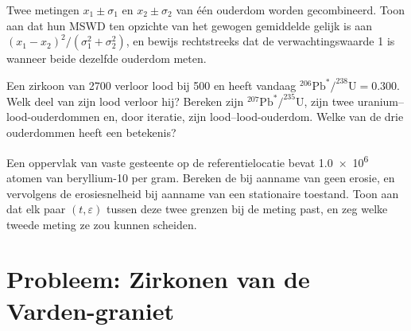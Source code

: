 \begin{exercise}[$\star\star\star$]\label{exo:b3:advanced-geochronology:10}
Twee metingen $x_1 \pm \sigma_1$ en $x_2 \pm \sigma_2$ van één ouderdom worden
gecombineerd. Toon aan dat hun MSWD ten opzichte van het gewogen gemiddelde gelijk is aan
$(x_1 - x_2)^2/(\sigma_1^2 + \sigma_2^2)$, en bewijs rechtstreeks dat de
verwachtingswaarde 1 is wanneer beide dezelfde ouderdom meten.
\end{exercise}

\begin{exercise}[$\star\star\star$]\label{exo:b3:advanced-geochronology:11}
Een zirkoon van \qty{2700}{\Ma} verloor lood bij \qty{500}{\Ma} en heeft vandaag
$^{206}\mathrm{Pb}^*/^{238}\mathrm{U} = 0.300$. Welk deel van zijn lood verloor hij?
Bereken zijn $^{207}\mathrm{Pb}^*/^{235}\mathrm{U}$, zijn twee uranium--lood-ouderdommen
en, door iteratie, zijn lood--lood-ouderdom. Welke van de drie ouderdommen heeft
een betekenis?
\end{exercise}

\begin{exercise}[$\star\star\star$]\label{exo:b3:advanced-geochronology:12}
Een oppervlak van vaste gesteente op de referentielocatie bevat \num{1.0e6} atomen van
beryllium-10 per gram. Bereken de  bij aanname van geen erosie, en
vervolgens de erosiesnelheid bij aanname van een stationaire toestand. Toon aan dat elk paar $(t, \varepsilon)$
tussen deze twee grenzen bij de meting past, en zeg welke tweede
meting ze zou kunnen scheiden.
\end{exercise}

\section{Probleem: Zirkonen van de Varden-graniet}

